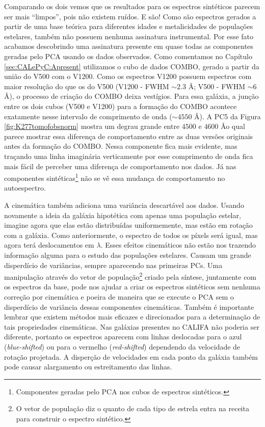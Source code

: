 Comparando os dois vemos que os resultados para os espectros sintéticos parecem ser mais ``limpos'', pois não existem
ruídos. E são! Como são espectros gerados a partir de uma base teórica para diferentes idades e metalicidades de
populações estelares, também não possuem nenhuma assinatura instrumental. Por esse fato acabamos descobrindo uma
assinatura presente em quase todas as componentes geradas pelo PCA usando os dados observados. Como comentamos no
Capítulo \ref{sec:CALePyC:Apresent} utilizamos o cubo de dados COMBO, gerado a partir da união do V500 com o V1200. Como
os espectros V1200 possuem espectros com maior resolução do que os do V500 (V1200 - FWHM $\sim 2.3$ \AA; V500 - FWHM
$\sim 6$ \AA), o processo de criação do COMBO deixa vestígios. Para essa galáxia, a junção entre os dois cubos (V500 e
V1200) para a formação do COMBO acontece exatamente nesse intervalo de comprimento de onda ($\sim 4550$ \AA). A PC5 da
Figura \ref{fig:K277tomofobsnorm} mostra um degrau grande entre $4500$ e $4600$ \AA o qual parece mostrar essa
diferença de comportamento entre as duas versões originais antes da formação do COMBO. Nessa componente fica mais
evidente, mas traçando uma linha imaginária verticamente por esse comprimento de onda fica mais fácil de perceber uma
diferença de comportamento nos dados. Já nas componentes sintéticas\footnote{Componentes geradas pelo PCA nos cubos de
espectros sintéticos.} não se vê essa mudança de comportamento no autoespectro.

A cinemática também adiciona uma variância descartável aos dados. Usando novamente a ideia da galáxia hipotética com
apenas uma população estelar, imagine agora que elas estão distribuídas uniformemente, mas estão em rotação com a
galáxia. Como anteriormente, o espectro de todos os píxels será igual, mas agora terá deslocamentos em $\lambda$. Esses
efeitos cinemáticos não estão nos trazendo informação alguma para o estudo das populações estelares. Causam um grande
disperdício de variâncias, sempre aparecendo nas primeiras PCs. Uma manipulação através do vetor de população\footnote{O
vetor de população diz o quanto de cada tipo de estrela entra na receita para construir o espectro sintético.} criado
pela síntese, juntamente com os espectros da base, pode nos ajudar a criar os espectros sintéticos sem nenhuma correção
por cinemática e poeira de maneira que se execute o PCA sem o disperdício de variância dessas componentes cinemáticas.
Também é importante lembrar que existem métodos mais eficazes e direcionados para a determinação de tais propriedades
cinemáticas. Nas galáxias presentes no CALIFA não poderia ser diferente, portanto os espectros aparecem com linhas
deslocadas para o azul ({\em blue-shifted}) ou para o vermelho ({\em red-shifted}) dependendo da velocidade de rotação
projetada. A disperção de velocidades em cada ponto da galáxia também pode causar alargamento ou estreitamento das
linhas.

